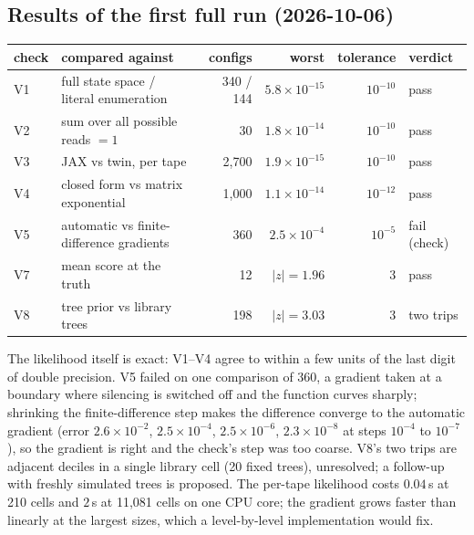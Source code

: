 \documentclass[11pt]{article}
\begin{document}
\subsection*{Results of the first full run (2026-10-06)}
\begin{center}\small
\begin{tabular}{@{}llrrrl@{}}
\toprule
check & compared against & configs & worst & tolerance & verdict\\
\midrule
V1 & full state space / literal enumeration & 340 / 144 & $5.8\times10^{-15}$ & $10^{-10}$ & pass\\
V2 & sum over all possible reads $=1$ & 30 & $1.8\times10^{-14}$ & $10^{-10}$ & pass\\
V3 & JAX vs twin, per tape & 2{,}700 & $1.9\times10^{-15}$ & $10^{-10}$ & pass\\
V4 & closed form vs matrix exponential & 1{,}000 & $1.1\times10^{-14}$ & $10^{-12}$ & pass\\
V5 & automatic vs finite-difference gradients & 360 & $2.5\times10^{-4}$ & $10^{-5}$ & fail (check)\\
V7 & mean score at the truth & 12 & $|z|=1.96$ & $3$ & pass\\
V8 & tree prior vs library trees & 198 & $|z|=3.03$ & $3$ & two trips\\
\bottomrule
\end{tabular}
\end{center}
The likelihood itself is exact: V1--V4 agree to within a few units of the last digit of double
precision. V5 failed on one comparison of 360, a gradient taken at a boundary where silencing is
switched off and the function curves sharply; shrinking the finite-difference step makes the
difference converge to the automatic gradient (error $2.6\times10^{-2}$, $2.5\times10^{-4}$,
$2.5\times10^{-6}$, $2.3\times10^{-8}$ at steps $10^{-4}$ to $10^{-7}$), so the gradient is right and
the check's step was too coarse. V8's two trips are adjacent deciles in a single library cell (20 fixed
trees), unresolved; a follow-up with freshly simulated trees is proposed. The per-tape likelihood costs
$0.04$\,s at 210 cells and $2$\,s at 11{,}081 cells on one CPU core; the gradient grows faster than
linearly at the largest sizes, which a level-by-level implementation would fix.
\end{document}
